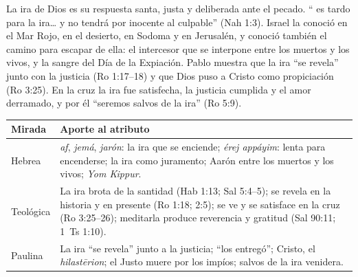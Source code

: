 \begin{tcolorbox}[colback=papiro,colframe=azul,boxrule=1pt,arc=3pt]
La ira de Dios es su respuesta santa, justa y deliberada ante el pecado. ``\SENOR{} es tardo para la ira\ldots{} y no tendrá por inocente al culpable'' (Nah 1:3). Israel la conoció en el Mar Rojo, en el desierto, en Sodoma y en Jerusalén, y conoció también el camino para escapar de ella: el intercesor que se interpone entre los muertos y los vivos, y la sangre del Día de la Expiación. Pablo muestra que la ira ``se revela'' junto con la justicia (Ro 1:17--18) y que Dios puso a Cristo como propiciación (Ro 3:25). En la cruz la ira fue satisfecha, la justicia cumplida y el amor derramado, y por él ``seremos salvos de la ira'' (Ro 5:9).
\end{tcolorbox}

\begin{center}\small\renewcommand{\arraystretch}{1.3}
\begin{tabular}{@{}L{3.0cm}L{11.4cm}@{}}
\toprule
\textbf{Mirada} & \textbf{Aporte al atributo} \\ \midrule
Hebrea & \emph{af}, \emph{jemá}, \emph{jarón}: la ira que se enciende; \emph{érej appáyim}: lenta para encenderse; la ira como juramento; Aarón entre los muertos y los vivos; \emph{Yom Kippur}. \\
Teológica & La ira brota de la santidad (Hab 1:13; Sal 5:4--5); se revela en la historia y en presente (Ro 1:18; 2:5); se ve y se satisface en la cruz (Ro 3:25--26); meditarla produce reverencia y gratitud (Sal 90:11; 1~Ts 1:10). \\
Paulina & La ira ``se revela'' junto a la justicia; ``los entregó''; Cristo, el \emph{hilastērion}; el Justo muere por los impíos; salvos de la ira venidera. \\
\bottomrule
\end{tabular}\end{center}

